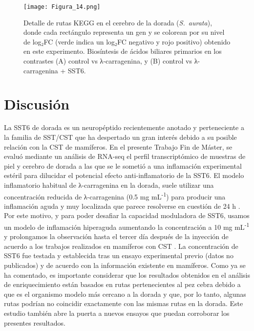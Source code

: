 \documentclass[10pt,a4paper]{article}
\begin{document}
\begin{figure}[htbp]
  \centering
 \texttt{[image: Figura\_14.png]}
 
  \caption{Detalle de rutas KEGG en el cerebro de la dorada (\textit{S.\ aurata}), donde cada rectángulo representa un gen y se colorean por su nivel de log₂FC (verde indica un log₂FC negativo y rojo positivo) obtenido en este experimento. Biosíntesis de ácidos biliares primarios en los contrastes (A) control vs λ-carragenina, y (B) control vs λ-carragenina + SST6.}
  \label{fig:14}
\end{figure}


\section{Discusión}
La SST6 de dorada es un neuropéptido recientemente anotado y perteneciente a la familia de SST/CST que ha despertado un gran interés debido a su posible relación con la CST de mamíferos. En el presente Trabajo Fin de Máster, se evaluó mediante un análisis de RNA-seq el perfil transcriptómico de muestras de piel y cerebro de dorada a las que se le sometió a una inflamación experimental estéril para dilucidar el potencial efecto anti-inflamatorio de la SST6. El modelo inflamatorio habitual de λ-carragenina en la dorada, suele utilizar una concentración reducida de λ-carragenina (0.5 mg mL\textsuperscript{-1}) para producir una inflamación aguda y muy localizada que parece resolverse en cuestión de 24 h \parencite{CamposSanchez2021a,CamposSanchez2021b}. Por este motivo, y para poder desafiar la capacidad moduladora de SST6, usamos un modelo de inflamación hiperaguda aumentando la concentración a 10 mg mL\textsuperscript{-1} \parencite{CamposSanchez2025} y prolongamos la observación hasta el tercer día después de la inyección de acuerdo a los trabajos realizados en mamíferos con CST \parencite{DelgadoMaroto2017,GonzalezRey2007}. La concentración de SST6 fue testada y establecida tras un ensayo experimental previo (datos no publicados) y de acuerdo con la información existente en mamíferos. Como ya se ha comentado, es importante considerar que los resultados obtenidos en el análisis de enriquecimiento están basados en rutas pertenecientes al pez cebra debido a que es el organismo modelo más cercano a la dorada y que, por lo tanto, algunas rutas podrían no coincidir exactamente con las mismas rutas en la dorada. Este estudio también abre la puerta a nuevos ensayos que puedan corroborar los presentes resultados.
\end{document}
